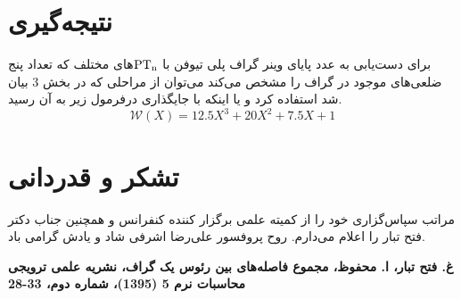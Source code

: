 \documentclass[Persian]{cacna2023-fa}
\begin{document}
			







				



				\section{نتیجه‌گیری}\label{conc}
				برای دست‌یابی به عدد پایای وینر گراف پلی تیوفن با ${\rm PT_{n}}$های مختلف
				که تعداد پنج ضلعی‌های موجود در گراف را مشخص می‌کند می‌توان از 
				مراحلی که در بخش 3 بیان شد استفاده کرد و یا اینکه با 
				جایگذاری درفرمول زیر به آن رسید.
				\begin{equation}
					\mathcal{W}(X) = 12.5X^{3}+20X^{2}+7.5X+1
				\end{equation}




				
				\section*{تشکر و قدردانی}
				مراتب سپاس‌گزاری خود را از کمیته علمی برگزار کننده 
				کنفرانس و 
				همچنین جناب دکتر فتح تبار را اعلام
				می‌دارم. 
				روح پروفسور علی‌رضا اشرفی شاد و یادش گرامی باد.
				

			
				
				\begin{thebibliography}{}

					\textbf{غ. فتح تبار، ا. محفوظ، مجموع فاصله‌های بین رئوس یک گراف، نشریه علمی ترویجی
				محاسبات نرم  5 (1395)،
				شماره دوم، 33-28}
					
				\end{thebibliography}
					
			
\end{document}
